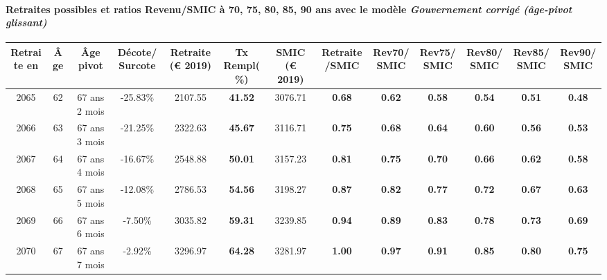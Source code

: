 \paragraph{Retraites possibles et ratios Revenu/SMIC à 70, 75, 80, 85, 90 ans avec le modèle \emph{Gouvernement corrigé (âge-pivot glissant)}}  
 
{ \scriptsize \begin{center} 
\begin{tabular}[htb]{|c|c||c|c||c|c||c||c|c|c|c|c|c|} 
\hline 
 Retraite en &  Âge &  Âge pivot &  Décote/Surcote &  Retraite (\euro{} 2019) &  Tx Rempl(\%) &  SMIC (\euro{} 2019) &  Retraite/SMIC &  Rev70/SMIC &  Rev75/SMIC &  Rev80/SMIC &  Rev85/SMIC &  Rev90/SMIC \\ 
\hline \hline 
 2065 &  62 &  67 ans 2 mois &  -25.83\% &  2107.55 &  {\bf 41.52} &  3076.71 &  {\bf {\color{red} 0.68}} &  {\bf {\color{red} 0.62}} &  {\bf {\color{red} 0.58}} &  {\bf {\color{red} 0.54}} &  {\bf {\color{red} 0.51}} &  {\bf {\color{red} 0.48}} \\ 
\hline 
 2066 &  63 &  67 ans 3 mois &  -21.25\% &  2322.63 &  {\bf 45.67} &  3116.71 &  {\bf {\color{red} 0.75}} &  {\bf {\color{red} 0.68}} &  {\bf {\color{red} 0.64}} &  {\bf {\color{red} 0.60}} &  {\bf {\color{red} 0.56}} &  {\bf {\color{red} 0.53}} \\ 
\hline 
 2067 &  64 &  67 ans 4 mois &  -16.67\% &  2548.88 &  {\bf 50.01} &  3157.23 &  {\bf {\color{red} 0.81}} &  {\bf {\color{red} 0.75}} &  {\bf {\color{red} 0.70}} &  {\bf {\color{red} 0.66}} &  {\bf {\color{red} 0.62}} &  {\bf {\color{red} 0.58}} \\ 
\hline 
 2068 &  65 &  67 ans 5 mois &  -12.08\% &  2786.53 &  {\bf 54.56} &  3198.27 &  {\bf {\color{red} 0.87}} &  {\bf {\color{red} 0.82}} &  {\bf {\color{red} 0.77}} &  {\bf {\color{red} 0.72}} &  {\bf {\color{red} 0.67}} &  {\bf {\color{red} 0.63}} \\ 
\hline 
 2069 &  66 &  67 ans 6 mois &  -7.50\% &  3035.82 &  {\bf 59.31} &  3239.85 &  {\bf {\color{red} 0.94}} &  {\bf {\color{red} 0.89}} &  {\bf {\color{red} 0.83}} &  {\bf {\color{red} 0.78}} &  {\bf {\color{red} 0.73}} &  {\bf {\color{red} 0.69}} \\ 
\hline 
 2070 &  67 &  67 ans 7 mois &  -2.92\% &  3296.97 &  {\bf 64.28} &  3281.97 &  {\bf 1.00} &  {\bf {\color{red} 0.97}} &  {\bf {\color{red} 0.91}} &  {\bf {\color{red} 0.85}} &  {\bf {\color{red} 0.80}} &  {\bf {\color{red} 0.75}} \\ 
\hline 
\hline 
\end{tabular} 
\end{center} } 
